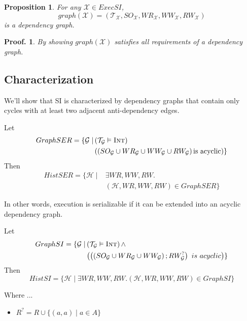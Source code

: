 \documentclass{beamer}
\newtheorem*{prop}{Proposition}
\newtheorem*{proofnosq}{Proof.}
\begin{document}
\begin{frame}
	\begin{prop}
		For any $\mathcal{X} \in ExecSI$,
		$$
			graph(\mathcal{X}) = (\mathcal{T}_\mathcal{X}, SO_\mathcal{X}, WR_\mathcal{X}, WW_\mathcal{X}, RW_\mathcal{X})
		$$
		is a dependency graph.
	\end{prop}
	\begin{proofnosq}
		By showing $graph(\mathcal{X})$ satisfies all requirements of a dependency graph.
	\end{proofnosq}
\end{frame}

\subsection{Characterization}

\begin{frame}
	We'll show that SI is characterized by dependency graphs that contain only cycles with at least two adjacent anti-dependency edges.
\end{frame}

\begin{frame}
	\begin{theorem}
		Let
		$$
		\begin{aligned}
			GraphSER = \{ \mathcal{G} \mid & \left( \mathcal{T}_\mathcal{G} \vDash \textsc{Int} \right) \\
			      & \left(
		      		\left(
		    	  	 SO_\mathcal{G} \cup WR_\mathcal{G} \cup WW_\mathcal{G} \cup RW_\mathcal{G}
			      	\right) \text{is acyclic}
			        \right) \}
		\end{aligned}
		$$
		Then 
		$$
		\begin{aligned}
			HistSER = \{ \mathcal{H} \mid & \exists WR, WW, RW. \\
			& \left( \mathcal{H}, WR, WW, RW \right) \in GraphSER \}
		\end{aligned}
		$$	
	\end{theorem}
	In other words, execution is serializable if it can be extended into an acyclic dependency graph.
\end{frame}


\begin{frame}
	\begin{theorem}
		Let
		$$
			\begin{aligned}
			GraphSI = 
				\{ 
					\mathcal{G} 
					\mid &
					\left( \mathcal{T}_\mathcal{G} \vDash \textsc{Int} \right) \wedge \\
						 & \left(
							\left(
								\left(
									SO_\mathcal{G} \cup WR_\mathcal{G} \cup WW_\mathcal{G}
								\right)  ; RW_\mathcal{G}^?
						\right) \ is \ acyclic
					\right)
				\}	
			\end{aligned}
		$$
		Then
		$$
			HistSI = \{ \mathcal{H} \mid \exists WR, WW, RW. (\mathcal{H}, WR, WW, RW) \in GraphSI \}
		$$
	\end{theorem}
	Where ...
	\begin{itemize}
		\item $R^? = R \cup \{ (a, a) \mid a \in A \}$
	\end{itemize}
\end{frame}
\end{document}
